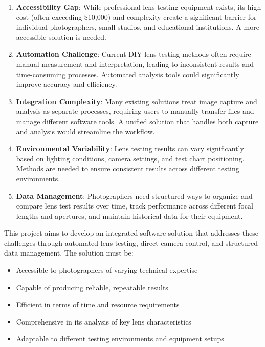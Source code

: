 \begin{enumerate}
    \item \textbf{Accessibility Gap}: While professional lens testing equipment exists, its high cost (often exceeding \$10,000) and complexity create a significant barrier for individual photographers, small studios, and educational institutions. A more accessible solution is needed.
    
    \item \textbf{Automation Challenge}: Current DIY lens testing methods often require manual measurement and interpretation, leading to inconsistent results and time-consuming processes. Automated analysis tools could significantly improve accuracy and efficiency.
    
    \item \textbf{Integration Complexity}: Many existing solutions treat image capture and analysis as separate processes, requiring users to manually transfer files and manage different software tools. A unified solution that handles both capture and analysis would streamline the workflow.
    
    \item \textbf{Environmental Variability}: Lens testing results can vary significantly based on lighting conditions, camera settings, and test chart positioning. Methods are needed to ensure consistent results across different testing environments.
    
    \item \textbf{Data Management}: Photographers need structured ways to organize and compare lens test results over time, track performance across different focal lengths and apertures, and maintain historical data for their equipment.
\end{enumerate}

This project aims to develop an integrated software solution that addresses these challenges through automated lens testing, direct camera control, and structured data management. The solution must be:

\begin{itemize}
    \item Accessible to photographers of varying technical expertise
    \item Capable of producing reliable, repeatable results
    \item Efficient in terms of time and resource requirements
    \item Comprehensive in its analysis of key lens characteristics
    \item Adaptable to different testing environments and equipment setups
\end{itemize}




